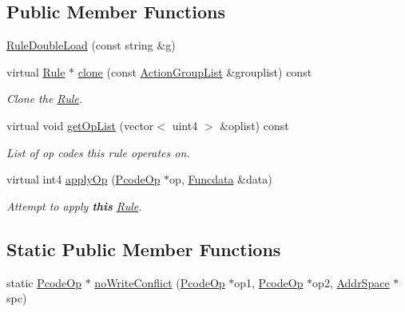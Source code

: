 \subsection*{Public Member Functions}
\begin{DoxyCompactItemize}
\item 
\mbox{\hyperlink{class_rule_double_load_a7b3b8f43136b3421f76abc0c77325e6b}{Rule\+Double\+Load}} (const string \&g)
\item 
virtual \mbox{\hyperlink{class_rule}{Rule}} $\ast$ \mbox{\hyperlink{class_rule_double_load_ac2d2342f59e7a6813b83457fe14ca386}{clone}} (const \mbox{\hyperlink{class_action_group_list}{Action\+Group\+List}} \&grouplist) const
\begin{DoxyCompactList}\small\item\em Clone the \mbox{\hyperlink{class_rule}{Rule}}. \end{DoxyCompactList}\item 
virtual void \mbox{\hyperlink{class_rule_double_load_a7869e2b5bec620dbd86cefd34829b4f1}{get\+Op\+List}} (vector$<$ uint4 $>$ \&oplist) const
\begin{DoxyCompactList}\small\item\em List of op codes this rule operates on. \end{DoxyCompactList}\item 
virtual int4 \mbox{\hyperlink{class_rule_double_load_afbb821bf5ea445001a47351ec57bbeb1}{apply\+Op}} (\mbox{\hyperlink{class_pcode_op}{Pcode\+Op}} $\ast$op, \mbox{\hyperlink{class_funcdata}{Funcdata}} \&data)
\begin{DoxyCompactList}\small\item\em Attempt to apply {\bfseries{this}} \mbox{\hyperlink{class_rule}{Rule}}. \end{DoxyCompactList}\end{DoxyCompactItemize}
\subsection*{Static Public Member Functions}
\begin{DoxyCompactItemize}
\item 
static \mbox{\hyperlink{class_pcode_op}{Pcode\+Op}} $\ast$ \mbox{\hyperlink{class_rule_double_load_abb24d24ca077b4bfe579cbe80b7680f6}{no\+Write\+Conflict}} (\mbox{\hyperlink{class_pcode_op}{Pcode\+Op}} $\ast$op1, \mbox{\hyperlink{class_pcode_op}{Pcode\+Op}} $\ast$op2, \mbox{\hyperlink{class_addr_space}{Addr\+Space}} $\ast$spc)
\end{DoxyCompactItemize}
